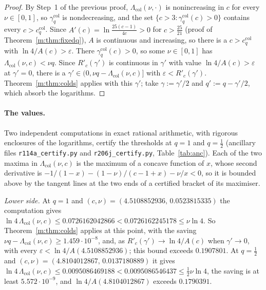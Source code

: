 \documentclass[11pt]{article}
\theoremstyle{definition}
\theoremstyle{remark}
\newcommand{\HintedOMvRtwenty}{0.1907801}%
\newcommand{\ColRangeHalf}{0.1790391}%
\newcommand{\ColGammaOne}{1.459\cdot10^{-8}}%
\newcommand{\ColGammaHalf}{5.572\cdot10^{-9}}%
\begin{document}
\begin{proof}
By Step~1 of the previous proof, $\Lambda_{\mathrm{col}}(\nu,\cdot)$ is nonincreasing in $c$ for every $\nu\in[0,1]$, so $\gamma^{\mathrm{col}}_q$ is nondecreasing, and the set $\{c>3:\gamma^{\mathrm{col}}_q(c)>0\}$ contains every $c>c^{\mathrm{col}}_q$. Since $A'(c)=\ln\frac{25(c-1)}{4c}>0$ for $c>\frac{25}{21}$ (proof of Theorem~\ref{m:thm:fixedq}), $A$ is continuous and increasing, so there is a $c>c^{\mathrm{col}}_q$ with $\ln4/A(c)>\varepsilon$. There $\gamma^{\mathrm{col}}_q(c)>0$, so some $\nu\in[0,1]$ has $\Lambda_{\mathrm{col}}(\nu,c)<\nu q$. Since $R'_c(\gamma')$ is continuous in $\gamma'$ with value $\ln4/A(c)>\varepsilon$ at $\gamma'=0$, there is a $\gamma'\in(0,\nu q-\Lambda_{\mathrm{col}}(\nu,c)]$ with $\varepsilon<R'_c(\gamma')$. Theorem~\ref{m:thm:colds} applies with this $\gamma'$; take $\gamma:=\gamma'/2$ and $q':=q-\gamma'/2$, which absorb the logarithms.
\end{proof}

\paragraph{The values.} Two independent computations in exact rational arithmetic, with rigorous enclosures of the logarithms, certify the thresholds at $q=1$ and $q=\frac12$ (ancillary files \texttt{r114a\_certify.py} and \texttt{r206j\_certify.py}, Table~\ref{tab:anc}). Each of the two maxima in $\Lambda_{\mathrm{col}}(\nu,c)$ is the maximum of a concave function of $x$, whose second derivative is $-1/(1-x)-(1-\nu)/(c-1+x)-\nu/x<0$, so it is bounded above by the tangent lines at the two ends of a certified bracket of its maximiser.

\emph{Lower side.} At $q=1$ and $(c,\nu)=(4.5108852936,\,0.0523815335)$ the computation gives $\ln4\,\Lambda_{\mathrm{col}}(\nu,c)\le0.0726162042866<0.0726162245178\le\nu\ln4$. So Theorem~\ref{m:thm:colds} applies at this point, with the saving $\nu q-\Lambda_{\mathrm{col}}(\nu,c)\ge\ColGammaOne$, and, as $R'_c(\gamma')\to\ln4/A(c)$ when $\gamma'\to0$, with every $\varepsilon<\ln4/A(4.5108852936)$; this bound exceeds $\HintedOMvRtwenty$. At $q=\frac12$ and $(c,\nu)=(4.8104012867,\,0.0137180889)$ it gives $\ln4\,\Lambda_{\mathrm{col}}(\nu,c)\le0.0095086469188<0.0095086546437\le\frac12\nu\ln4$, the saving is at least $\ColGammaHalf$, and $\ln4/A(4.8104012867)$ exceeds $\ColRangeHalf$.
\end{document}
